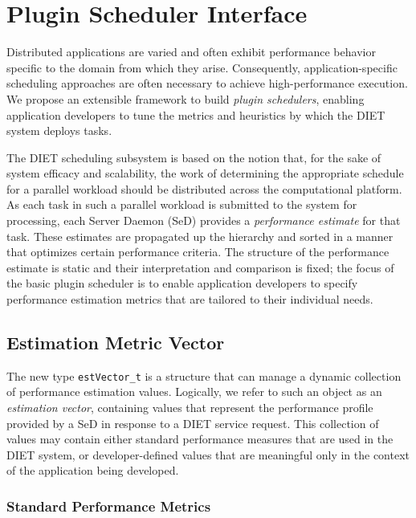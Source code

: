 \section{Plugin Scheduler Interface}

Distributed applications are varied and often exhibit performance
behavior specific to the domain from which they arise.  Consequently,
application-specific scheduling approaches are often necessary to
achieve high-performance execution.  We propose an extensible
framework to build
\emph{plugin schedulers}, enabling application developers to tune the
metrics and heuristics by which the DIET system deploys tasks.

The DIET scheduling subsystem is based on the notion that, for the
sake of system efficacy and scalability, the work of
determining the appropriate schedule for a parallel workload should be
distributed across the computational platform.  As each task in
such a parallel workload is submitted to the system for processing,
each Server Daemon (SeD) provides a
\emph{performance estimate} for that task.  These estimates are
propagated up the hierarchy and sorted in a manner that optimizes
certain performance criteria.  The structure of the
performance estimate is static and their interpretation and comparison
is fixed; the focus of the basic plugin scheduler is to enable
application developers to specify performance estimation metrics that
are tailored to their individual needs.


\subsection{Estimation Metric Vector}\label{sect:estvector}

The new type \texttt{estVector\_t} is a structure that can manage a
dynamic collection of performance estimation values.  Logically, we
refer to such an object as an \emph{estimation vector}, containing
values that represent the performance profile provided by a
SeD in response to a DIET service request.  This collection of values
may contain either standard performance measures that are used in the
DIET system, or developer-defined values that are meaningful only in
the context of the application being developed.

\subsubsection{Standard Performance Metrics}

